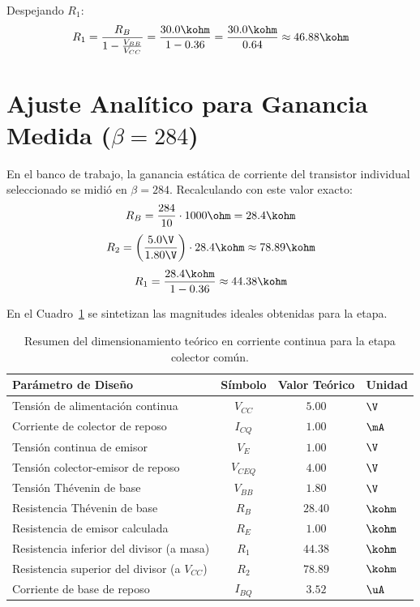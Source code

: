 Despejando $R_1$:
\begin{equation}
  R_1 = \frac{R_B}{1 - \frac{V_{BB}}{V_{CC}}} = \frac{30.0\kohm}{1 - 0.36} = \frac{30.0\kohm}{0.64} \approx 46.88\kohm
  \label{eq:R1_teorico}
\end{equation}

\section{Ajuste Analítico para Ganancia Medida ($\beta = 284$)}

En el banco de trabajo, la ganancia estática de corriente del transistor individual seleccionado se midió en
$\beta = 284$. Recalculando con este valor exacto:
\begin{equation}
  R_B = \frac{284}{10} \cdot 1000\ohm = 28.4\kohm
\end{equation}
\begin{equation}
  R_2 = \left(\frac{5.0\V}{1.80\V}\right) \cdot 28.4\kohm \approx 78.89\kohm
\end{equation}
\begin{equation}
  R_1 = \frac{28.4\kohm}{1 - 0.36} \approx 44.38\kohm
\end{equation}

En el Cuadro~\ref{tab:resumen_diseno_teorico} se sintetizan las magnitudes ideales obtenidas para la etapa.

\begin{table}[!ht]
  \centering
  \begin{tabular}{|l|c|c|l|}
    \hline
    \textbf{Parámetro de Diseño} & \textbf{Símbolo} & \textbf{Valor Teórico} & \textbf{Unidad} \\
    \hline
    Tensión de alimentación continua & $V_{CC}$ & $5.00$ & $\V$ \\
    Corriente de colector de reposo & $I_{CQ}$ & $1.00$ & $\mA$ \\
    Tensión continua de emisor & $V_E$ & $1.00$ & $\V$ \\
    Tensión colector-emisor de reposo & $V_{CEQ}$ & $4.00$ & $\V$ \\
    Tensión Thévenin de base & $V_{BB}$ & $1.80$ & $\V$ \\
    Resistencia Thévenin de base & $R_B$ & $28.40$ & $\kohm$ \\
    Resistencia de emisor calculada & $R_E$ & $1.00$ & $\kohm$ \\
    Resistencia inferior del divisor (a masa) & $R_1$ & $44.38$ & $\kohm$ \\
    Resistencia superior del divisor (a $V_{CC}$) & $R_2$ & $78.89$ & $\kohm$ \\
    Corriente de base de reposo & $I_{BQ}$ & $3.52$ & $\uA$ \\
    \hline
  \end{tabular}
  \caption{Resumen del dimensionamiento teórico en corriente continua para la etapa colector común.}
  \label{tab:resumen_diseno_teorico}
\end{table}
